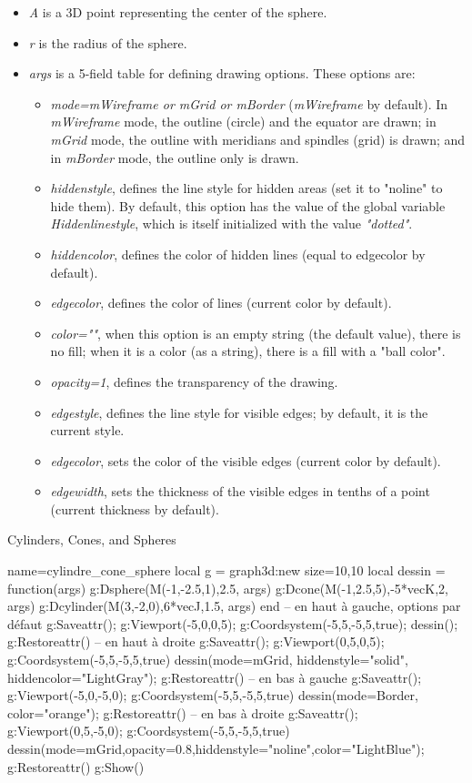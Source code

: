\begin{itemize}
    \item \emph{A} is a 3D point representing the center of the sphere.
    \item \emph{r} is the radius of the sphere.
    \item \emph{args} is a 5-field table for defining drawing options. These options are:
\begin{itemize}
    \item \emph{mode=mWireframe or mGrid or mBorder} (\emph{mWireframe} by default). In \emph{mWireframe} mode, the outline (circle) and the equator are drawn; in \emph{mGrid} mode, the outline with meridians and spindles (grid) is drawn; and in \emph{mBorder} mode, the outline only is drawn.
    \item \emph{hiddenstyle}, defines the line style for hidden areas (set it to "noline" to hide them). By default, this option has the value of the global variable \emph{Hiddenlinestyle}, which is itself initialized with the value \emph{"dotted"}.
    \item \emph{hiddencolor}, defines the color of hidden lines (equal to edgecolor by default).
    \item \emph{edgecolor}, defines the color of lines (current color by default).
    \item \emph{color=""}, when this option is an empty string (the default value), there is no fill; when it is a color (as a string), there is a fill with a "ball color".
    \item \emph{opacity=1}, defines the transparency of the drawing.
    \item \emph{edgestyle}, defines the line style for visible edges; by default, it is the current style.
    \item \emph{edgecolor}, sets the color of the visible edges (current color by default).
    \item \emph{edgewidth}, sets the thickness of the visible edges in tenths of a point (current thickness by default).
\end{itemize}
\end{itemize}

\begin{demo}{Cylinders, Cones, and Spheres}
\begin{luadraw}{name=cylindre_cone_sphere}
local g = graph3d:new{ size={10,10} }
local dessin = function(args)
    g:Dsphere(M(-1,-2.5,1),2.5, args)
    g:Dcone(M(-1,2.5,5),-5*vecK,2, args)
    g:Dcylinder(M(3,-2,0),6*vecJ,1.5, args)
end
-- en haut à gauche, options par défaut
g:Saveattr(); g:Viewport(-5,0,0,5); g:Coordsystem(-5,5,-5,5,true); dessin(); g:Restoreattr()
-- en haut à droite
g:Saveattr(); g:Viewport(0,5,0,5); g:Coordsystem(-5,5,-5,5,true)
dessin({mode=mGrid, hiddenstyle="solid", hiddencolor="LightGray"}); g:Restoreattr()
-- en bas à gauche
g:Saveattr(); g:Viewport(-5,0,-5,0); g:Coordsystem(-5,5,-5,5,true)
dessin({mode=Border, color="orange"}); g:Restoreattr()
-- en bas à droite
g:Saveattr(); g:Viewport(0,5,-5,0); g:Coordsystem(-5,5,-5,5,true)
dessin({mode=mGrid,opacity=0.8,hiddenstyle="noline",color="LightBlue"}); g:Restoreattr()
g:Show()            
\end{luadraw}
\end{demo}
